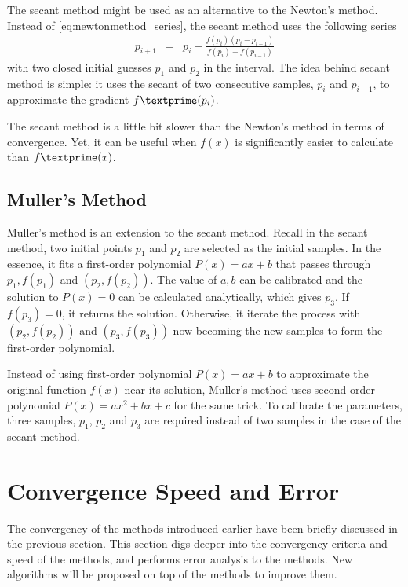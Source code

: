 The secant method might be used as an alternative to the Newton's method. Instead of \eqref{eq:newtonmethod_series}, the secant method uses the following series
\begin{eqnarray}
  p_{i+1} &=& p_i - \frac{f(p_i)(p_i-p_{i-1})}{f(p_i)-f(p_{i-1})} \nonumber
\end{eqnarray}
with two closed initial guesses $p_1$ and $p_2$ in the interval. The idea behind secant method is simple: it uses the secant of two consecutive samples, $p_i$ and $p_{i-1}$, to approximate the gradient $f\textprime(p_i)$.

The secant method is a little bit slower than the Newton's method in terms of convergence. Yet, it can be useful when $f(x)$ is significantly easier to calculate than $f\textprime(x)$.

\subsection{Muller's Method}

Muller's method is an extension to the secant method. Recall in the secant method, two initial points $p_1$ and $p_2$ are selected as the initial samples. In the essence, it fits a first-order polynomial $P(x)=ax+b$ that passes through $p_1, f(p_1)$ and $(p_2, f(p_2))$. The value of $a, b$ can be calibrated and the solution to $P(x)=0$ can be calculated analytically, which gives $p_3$. If $f(p_3)=0$, it returns the solution. Otherwise, it iterate the process with $(p_2, f(p_2))$ and $(p_3, f(p_3))$ now becoming the new samples to form the first-order polynomial.

Instead of using first-order polynomial $P(x)=ax + b$ to approximate the original function $f(x)$ near its solution, Muller's method uses second-order polynomial $P(x)=ax^2+bx+c$ for the same trick. To calibrate the parameters, three samples, $p_1$, $p_2$ and $p_3$ are required instead of two samples in the case of the secant method.

\section{Convergence Speed and Error}

The convergency of the methods introduced earlier have been briefly discussed in the previous section. This section digs deeper into the convergency criteria and speed of the methods, and performs error analysis to the methods. New algorithms will be proposed on top of the methods to improve them.

